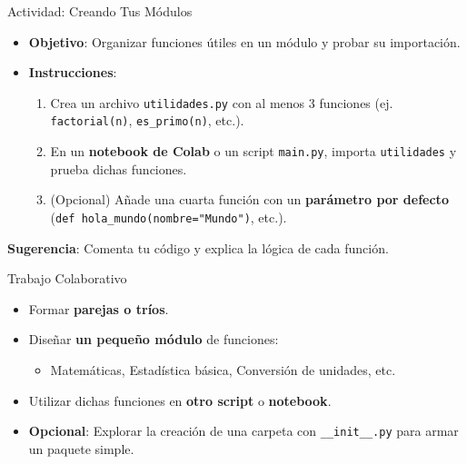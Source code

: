 \documentclass[10pt]{beamer}
\begin{document}
\begin{frame}{Actividad: Creando Tus Módulos}
  \begin{itemize}
    \item \textbf{Objetivo}: Organizar funciones útiles en un módulo y probar su importación.
    \item \textbf{Instrucciones}:
      \begin{enumerate}
        \item Crea un archivo \texttt{utilidades.py} con al menos 3 funciones (ej. \texttt{factorial(n)}, \texttt{es\_primo(n)}, etc.).
        \item En un \textbf{notebook de Colab} o un script \texttt{main.py}, importa \texttt{utilidades} y prueba dichas funciones.
        \item (Opcional) Añade una cuarta función con un \textbf{parámetro por defecto} (\texttt{def hola\_mundo(nombre="Mundo")}, etc.).
      \end{enumerate}
  \end{itemize}
  \textbf{Sugerencia}: Comenta tu código y explica la lógica de cada función.
\end{frame}

\begin{frame}{Trabajo Colaborativo}
  \begin{itemize}
    \item Formar \textbf{parejas o tríos}.
    \item Diseñar \textbf{un pequeño módulo} de funciones:
      \begin{itemize}
        \item Matemáticas, Estadística básica, Conversión de unidades, etc.
      \end{itemize}
    \item Utilizar dichas funciones en \textbf{otro script} o \textbf{notebook}.
    \item \textbf{Opcional}: Explorar la creación de una carpeta con \texttt{\_\_init\_\_.py} para armar un paquete simple.
  \end{itemize}
\end{frame}
\end{document}
